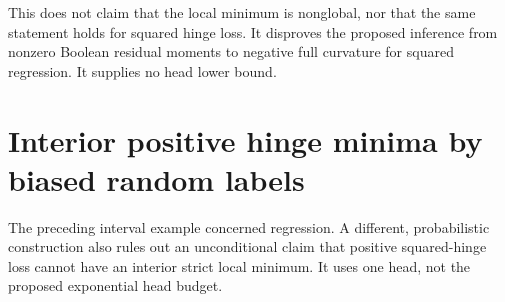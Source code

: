 \documentclass[11pt]{article}
\begin{document}
This does not claim that the local minimum is nonglobal, nor that the
same statement holds for squared hinge loss. It disproves the proposed
inference from nonzero Boolean residual moments to negative full
curvature for squared regression. It supplies no head lower bound.

\section{Interior positive hinge minima by biased random labels}

The preceding interval example concerned regression. A different,
probabilistic construction also rules out an unconditional claim that
positive squared-hinge loss cannot have an interior strict local minimum.
It uses one head, not the proposed exponential head budget.
\end{document}
